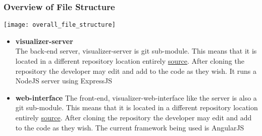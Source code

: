 \subsubsection{Overview of File Structure}
\texttt{[image: overall\_file\_structure]} \\[0.5cm]
\begin{itemize}
	\item \textbf{visualizer-server} \\
	The back-end server, visualizer-server is git sub-module. This means that it is located in a different repository location entirely \href{https://github.com/Coeus2016/visualizer-server}{source}. After cloning the repository the developer may edit and add to the code as they wish. It runs a NodeJS server using ExpressJS 
	
	\item \textbf{web-interface}
	The front-end, visualizer-web-interface like the server is also a git sub-module. This means that it is located in a different repository location entirely \href{https://github.com/Coeus2016/visualizer-web-interface}{source}. After cloning the repository the developer may edit and add to the code as they wish. The current framework being used is AngularJS
\end{itemize}
